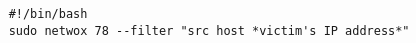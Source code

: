 \begin{verbatim}
    #!/bin/bash
    sudo netwox 78 --filter "src host *victim's IP address*"
    
\end{verbatim}